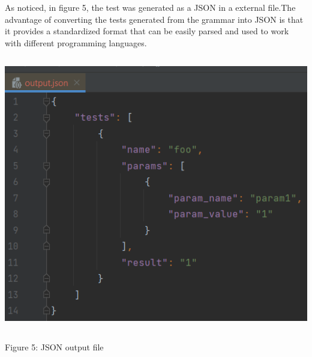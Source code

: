 As noticed, in figure 5, the test was generated as a JSON in a external file.The advantage of converting the tests generated from the grammar into JSON is that it provides a standardized format that can be easily parsed and used to work with different programming languages.

{ \centering \includegraphics[width=\textwidth, height=12cm]{images/output.png} }
\begin{center} Figure 5: JSON output file  \end{center}

